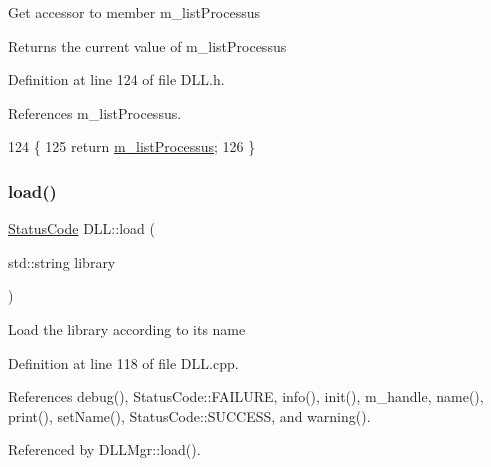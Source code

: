 Get accessor to member m\+\_\+list\+Processus \begin{DoxyReturn}{Returns}
the current value of m\+\_\+list\+Processus 
\end{DoxyReturn}


Definition at line 124 of file D\+L\+L.\+h.



References m\+\_\+list\+Processus.


\begin{DoxyCode}
124                                    \{
125     \textcolor{keywordflow}{return} \hyperlink{classDLL_a197e92b990184a27a74f4a0456897bd5}{m\_listProcessus};
126   \}
\end{DoxyCode}
\mbox{\label{classDLL_a64166d3479edf7e44fd539841e70fb3a}} 
\subsubsection{\texorpdfstring{load()}{load()}}
{\footnotesize\ttfamily \hyperlink{classStatusCode}{Status\+Code} D\+L\+L\+::load (\begin{DoxyParamCaption}\item[{std\+::string}]{library }\end{DoxyParamCaption})}

Load the library according to its name 

Definition at line 118 of file D\+L\+L.\+cpp.



References debug(), Status\+Code\+::\+F\+A\+I\+L\+U\+RE, info(), init(), m\+\_\+handle, name(), print(), set\+Name(), Status\+Code\+::\+S\+U\+C\+C\+E\+SS, and warning().



Referenced by D\+L\+L\+Mgr\+::load().


